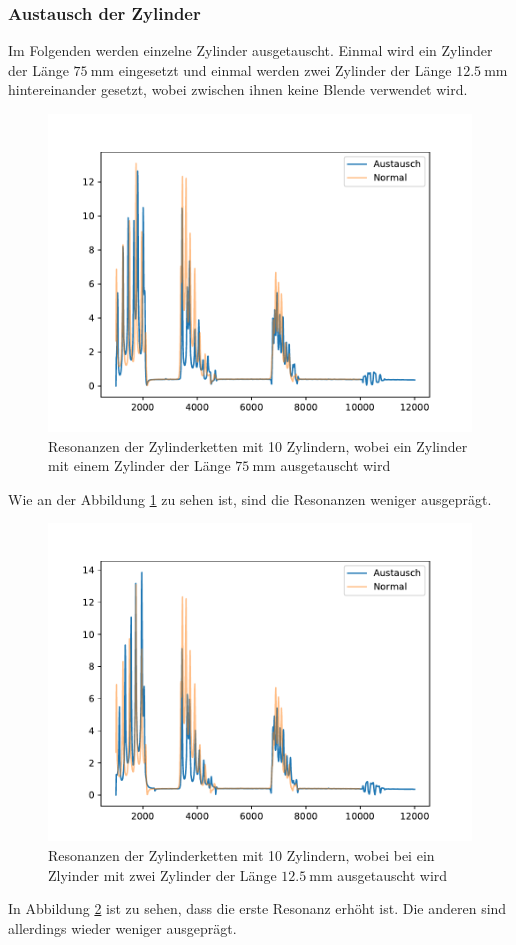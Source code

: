 \subsubsection{Austausch der Zylinder}
Im Folgenden werden einzelne Zylinder ausgetauscht. Einmal wird ein Zylinder der Länge $\SI{75}{\milli\meter}$ eingesetzt und
einmal werden zwei Zylinder der Länge $\SI{12.5}{\milli\meter}$ hintereinander gesetzt, wobei zwischen ihnen keine Blende verwendet wird.
\FloatBarrier
\begin{figure}
    \centering
    \includegraphics[width=\textwidth,keepaspectratio]{figure/Austausch_75mm.pdf}
    \caption{Resonanzen der Zylinderketten mit 10 Zylindern, wobei ein Zylinder mit einem Zylinder der Länge $\SI{75}{\milli\meter}$ ausgetauscht wird}
    \label{fig:Austausch_75}
\end{figure}
\FloatBarrier
Wie an der Abbildung \ref{fig:Austausch_75} zu sehen ist, sind die Resonanzen weniger ausgeprägt.
\FloatBarrier
\begin{figure}
    \centering
    \includegraphics[width=\textwidth,keepaspectratio]{figure/Austausch_25mm.pdf}
    \caption{Resonanzen der Zylinderketten mit 10 Zylindern, wobei bei ein Zlyinder mit zwei Zylinder der Länge $\SI{12.5}{\milli\meter}$ ausgetauscht wird}
    \label{fig:Austausch_25}
\end{figure}
\FloatBarrier
In Abbildung \ref{fig:Austausch_25} ist zu sehen, dass die erste Resonanz erhöht ist. Die anderen sind allerdings wieder weniger ausgeprägt.


